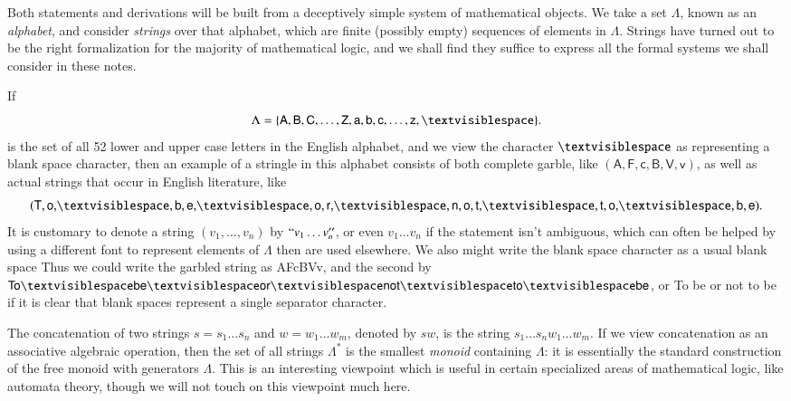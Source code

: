 Both statements and derivations will be built from a deceptively simple system of mathematical objects. We take a set $\Lambda$, known as an \emph{alphabet}, and consider \emph{strings} over that alphabet, which are finite (possibly empty) sequences of elements in $\Lambda$. Strings have turned out to be the right formalization for the majority of mathematical logic, and we shall find they suffice to express all the formal systems we shall consider in these notes.

\begin{example}
    If
    \[ \Lambda = \{ \mathsf{A,B,C}, \dots, \mathsf{Z, a, b, c,} \dots, \textsf{z}, \textvisiblespace \}. \]    
    is the set of all 52 lower and upper case letters in the English alphabet, and we view the character $\textvisiblespace$ as representing a blank space character, then an example of a stringle in this alphabet consists of both complete garble, like $(\mathsf{A,F,c,B,V,v})$, as well as actual strings that occur in English literature, like
    \[ (\mathsf{T,o,}\textvisiblespace\mathsf{,b,e,}\textvisiblespace\mathsf{,o,r,}\textvisiblespace\mathsf{,n,o,t,}\textvisiblespace\mathsf{,t,o,}\textvisiblespace\mathsf{,b,e}). \]
    It is customary to denote a string $(v_1, \dots, v_n)$ by $``v_1 \dots v_n''$, or even $v_1 \dots v_n$ if the statement isn't ambiguous, which can often be helped by using a different font to represent elements of $\Lambda$ then are used elsewhere. We also might write the blank space character as a usual blank space Thus we could write the garbled string as \textsf{AFcBVv}, and the second by $\mathsf{To}\textvisiblespace\mathsf{be}\textvisiblespace\mathsf{or}\textvisiblespace\mathsf{not}\textvisiblespace\mathsf{to}\textvisiblespace\mathsf{be}$, or \textsf{To be or not to be} if it is clear that blank spaces represent a single separator character.
\end{example}

The concatenation of two strings $s = s_1 \dots s_n$ and $w = w_1 \dots w_m$, denoted by $sw$, is the string $s_1 \dots s_n w_1 \dots w_m$. If we view concatenation as an associative algebraic operation, then the set of all strings $\Lambda^*$ is the smallest {\it monoid} containing $\Lambda$: it is essentially the standard construction of the free monoid with generators $\Lambda$. This is an interesting viewpoint which is useful in certain specialized areas of mathematical logic, like automata theory, though we will not touch on this viewpoint much here.

